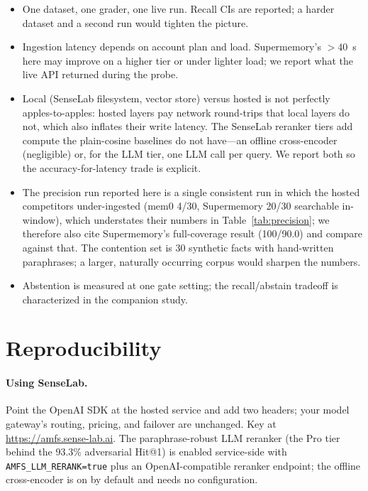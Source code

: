 \documentclass[11pt]{article}
\begin{document}
\begin{itemize}[topsep=2pt,itemsep=1pt]
\item One dataset, one grader, one live run. Recall CIs are reported; a harder dataset and a second run
  would tighten the picture.
\item Ingestion latency depends on account plan and load. Supermemory's ${>}40$~s here may improve on a
  higher tier or under lighter load; we report what the live API returned during the probe.
\item Local (SenseLab filesystem, vector store) versus hosted is not perfectly apples-to-apples: hosted
  layers pay network round-trips that local layers do not, which also inflates their write latency. The
  SenseLab reranker tiers add compute the plain-cosine baselines do not have---an offline cross-encoder
  (negligible) or, for the LLM tier, one LLM call per query. We report both so the accuracy-for-latency
  trade is explicit.
\item The precision run reported here is a single consistent run in which the hosted competitors
  under-ingested (mem0 4/30, Supermemory 20/30 searchable in-window), which understates their numbers in
  Table~\ref{tab:precision}; we therefore also cite Supermemory's full-coverage result (100/90.0) and
  compare against that. The contention set is 30 synthetic facts with hand-written paraphrases; a larger,
  naturally occurring corpus would sharpen the numbers.
\item Abstention is measured at one gate setting; the recall/abstain tradeoff is characterized in the
  companion study.
\end{itemize}

\appendix
\section{Reproducibility}

\paragraph{Using SenseLab.} Point the OpenAI SDK at the hosted service and add two headers; your model
gateway's routing, pricing, and failover are unchanged. Key at \url{https://amfs.sense-lab.ai}. The
paraphrase-robust LLM reranker (the Pro tier behind the 93.3\% adversarial Hit@1) is enabled service-side
with \texttt{AMFS\_LLM\_RERANK=true} plus an OpenAI-compatible reranker endpoint; the offline
cross-encoder is on by default and needs no configuration.
\end{document}
